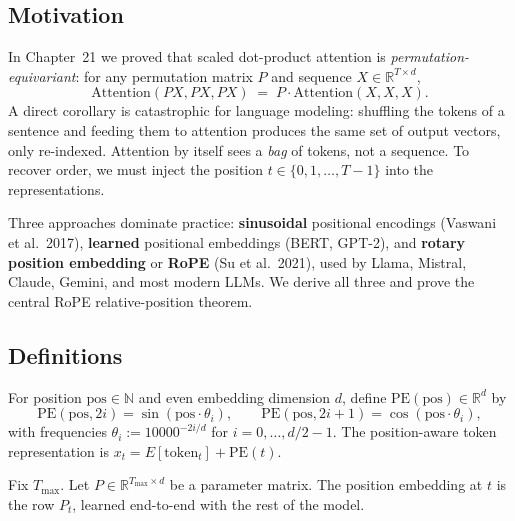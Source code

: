 \subsection*{Motivation}

In Chapter~21 we proved that scaled dot-product attention is \emph{permutation-equivariant}: for any permutation matrix $P$ and sequence $X \in \mathbb{R}^{T \times d}$,
\[
\mathrm{Attention}(PX, PX, PX) \;=\; P \cdot \mathrm{Attention}(X, X, X).
\]
A direct corollary is catastrophic for language modeling: shuffling the tokens of a sentence and feeding them to attention produces the same set of output vectors, only re-indexed. Attention by itself sees a \emph{bag} of tokens, not a sequence. To recover order, we must inject the position $t \in \{0, 1, \ldots, T-1\}$ into the representations.

Three approaches dominate practice: \textbf{sinusoidal} positional encodings (Vaswani et al.\ 2017), \textbf{learned} positional embeddings (BERT, GPT-2), and \textbf{rotary position embedding} or \textbf{RoPE} (Su et al.\ 2021), used by Llama, Mistral, Claude, Gemini, and most modern LLMs. We derive all three and prove the central RoPE relative-position theorem.

\subsection*{Definitions}

\begin{definition}
For position $\mathrm{pos} \in \mathbb{N}$ and even embedding dimension $d$, define $\mathrm{PE}(\mathrm{pos}) \in \mathbb{R}^d$ by
\[
\mathrm{PE}(\mathrm{pos}, 2i) = \sin(\mathrm{pos}\cdot \theta_i), \qquad
\mathrm{PE}(\mathrm{pos}, 2i+1) = \cos(\mathrm{pos}\cdot \theta_i),
\]
with frequencies $\theta_i := 10000^{-2i/d}$ for $i = 0, \ldots, d/2 - 1$. The position-aware token representation is $x_t = E[\mathrm{token}_t] + \mathrm{PE}(t)$.
\end{definition}

\begin{definition}
Fix $T_{\max}$. Let $P \in \mathbb{R}^{T_{\max} \times d}$ be a parameter matrix. The position embedding at $t$ is the row $P_t$, learned end-to-end with the rest of the model.
\end{definition}

